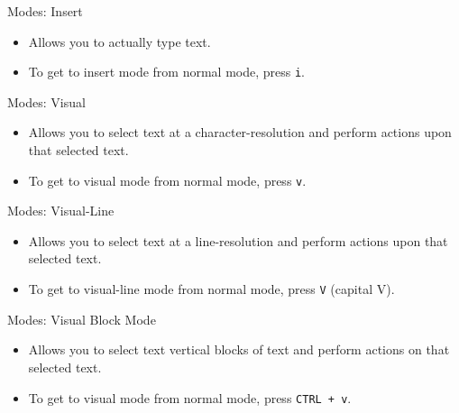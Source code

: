 \documentclass{lug}
\begin{document}
\begin{frame}{Modes: Insert}
    \begin{itemize}
        \item Allows you to actually type text.
        \item To get to insert mode from normal mode, press \texttt{i}.
    \end{itemize}
\end{frame}

\begin{frame}{Modes: Visual}
    \begin{itemize}
        \item Allows you to select text at a character-resolution and perform
            actions upon that selected text.
        \item To get to visual mode from normal mode, press \texttt{v}.
    \end{itemize}
\end{frame}

\begin{frame}{Modes: Visual-Line}
    \begin{itemize}
        \item Allows you to select text at a line-resolution and perform
            actions upon that selected text.
        \item To get to visual-line mode from normal mode, press \texttt{V}
            (capital V).
    \end{itemize}
\end{frame}

\begin{frame}{Modes: Visual Block Mode}
    \begin{itemize}
        \item Allows you to select text vertical blocks of text and perform
            actions on that selected text.
        \item To get to visual mode from normal mode, press \texttt{CTRL + v}.
    \end{itemize}
\end{frame}
\end{document}
